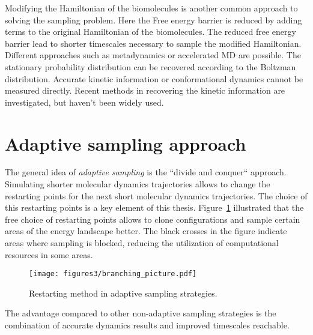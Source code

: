 Modifying the Hamiltonian of the biomolecules is another common approach to solving the sampling problem. Here the Free energy barrier is reduced by adding terms to the original Hamiltonian of the biomolecules.
The reduced free energy barrier lead to shorter timescales necessary to sample the modified Hamiltonian. Different approaches such as metadynamics \cite{laio2008metadynamics} or accelerated MD\cite{hamelberg2004accelerated} are possible. The stationary probability distribution can be recovered according to the Boltzman distribution. Accurate kinetic information or conformational dynamics cannot be measured directly. Recent methods in recovering the kinetic information\cite{pathreweight1, pathreweight2, pathreweight3, pathreweight4} are investigated, but haven't been widely used. 

\section{\label{sec:intro2}Adaptive sampling approach}



The general idea of \emph{adaptive sampling} is the ``divide and conquer`` approach. Simulating shorter molecular dynamics trajectories allows to change the restarting points for the next short molecular dynamics trajectories. The choice of this restarting points is a key element of this thesis. Figure~\ref{fig:branching} illustrated that the free choice of restarting points allows to clone configurations and sample certain areas of the energy landscape better. The black crosses in the figure indicate areas where sampling is blocked, reducing the utilization of computational resources in some areas.

\begin{figure}[h]
  \centering
  \texttt{[image: figures3/branching\_picture.pdf]}
  \caption{Restarting method in adaptive sampling strategies.}
  \label{fig:branching}
\end{figure}



The advantage compared to other non-adaptive sampling strategies is the combination of accurate dynamics results and improved timescales reachable.




